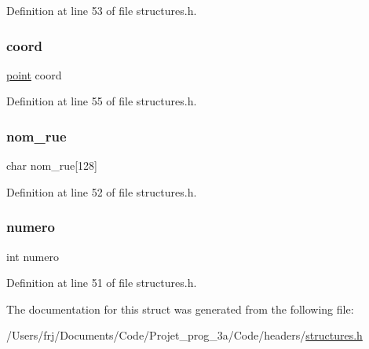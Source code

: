 Definition at line 53 of file structures.\+h.

\hypertarget{structadresse_a16be187ac405f3bb61930a342b444253}{}\label{structadresse_a16be187ac405f3bb61930a342b444253} 
\subsubsection{\texorpdfstring{coord}{coord}}
{\footnotesize\ttfamily \hyperlink{structpoint}{point} coord}



Definition at line 55 of file structures.\+h.

\hypertarget{structadresse_a5aafcf02ad3be5a371655c227684be8e}{}\label{structadresse_a5aafcf02ad3be5a371655c227684be8e} 
\subsubsection{\texorpdfstring{nom\+\_\+rue}{nom\_rue}}
{\footnotesize\ttfamily char nom\+\_\+rue\mbox{[}128\mbox{]}}



Definition at line 52 of file structures.\+h.

\hypertarget{structadresse_a2c30f43104974e72e2809fb4569804b0}{}\label{structadresse_a2c30f43104974e72e2809fb4569804b0} 
\subsubsection{\texorpdfstring{numero}{numero}}
{\footnotesize\ttfamily int numero}



Definition at line 51 of file structures.\+h.



The documentation for this struct was generated from the following file\+:\begin{DoxyCompactItemize}
\item 
/\+Users/frj/\+Documents/\+Code/\+Projet\+\_\+prog\+\_\+3a/\+Code/headers/\hyperlink{structures_8h}{structures.\+h}\end{DoxyCompactItemize}
